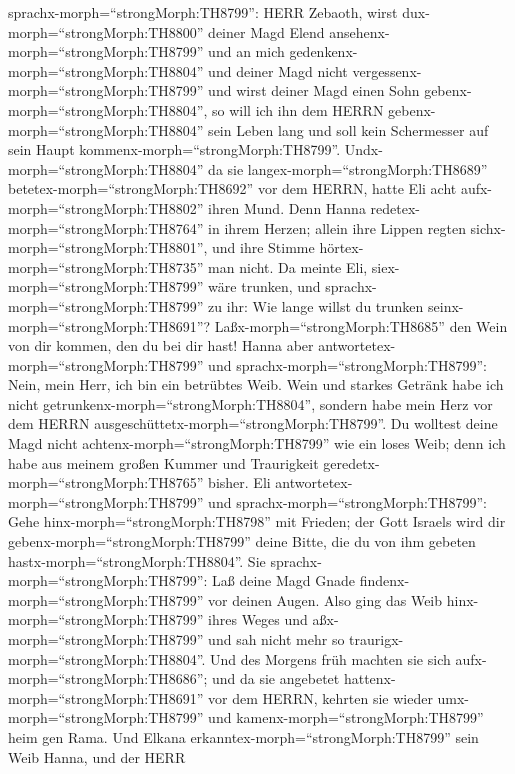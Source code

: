 sprachx-morph=``strongMorph:TH8799'': HERR Zebaoth, wirst
dux-morph=``strongMorph:TH8800'' deiner Magd Elend
ansehenx-morph=``strongMorph:TH8799'' und an mich
gedenkenx-morph=``strongMorph:TH8804'' und deiner Magd nicht
vergessenx-morph=``strongMorph:TH8799'' und wirst deiner Magd einen Sohn
gebenx-morph=``strongMorph:TH8804'', so will ich ihn dem HERRN
gebenx-morph=``strongMorph:TH8804'' sein Leben lang und soll kein
Schermesser auf sein Haupt kommenx-morph=``strongMorph:TH8799''.
 Undx-morph=``strongMorph:TH8804'' da sie
langex-morph=``strongMorph:TH8689'' betetex-morph=``strongMorph:TH8692''
vor dem HERRN, hatte Eli acht aufx-morph=``strongMorph:TH8802'' ihren
Mund.  Denn Hanna redetex-morph=``strongMorph:TH8764'' in
ihrem Herzen; allein ihre Lippen regten
sichx-morph=``strongMorph:TH8801'', und ihre Stimme
hörtex-morph=``strongMorph:TH8735'' man nicht. Da meinte Eli,
siex-morph=``strongMorph:TH8799'' wäre trunken,  und
sprachx-morph=``strongMorph:TH8799'' zu ihr: Wie lange willst du trunken
seinx-morph=``strongMorph:TH8691''? Laßx-morph=``strongMorph:TH8685''
den Wein von dir kommen, den du bei dir hast!  Hanna aber
antwortetex-morph=``strongMorph:TH8799'' und
sprachx-morph=``strongMorph:TH8799'': Nein, mein Herr, ich bin ein
betrübtes Weib. Wein und starkes Getränk habe ich nicht
getrunkenx-morph=``strongMorph:TH8804'', sondern habe mein Herz vor dem
HERRN ausgeschüttetx-morph=``strongMorph:TH8799''.  Du
wolltest deine Magd nicht achtenx-morph=``strongMorph:TH8799'' wie ein
loses Weib; denn ich habe aus meinem großen Kummer und Traurigkeit
geredetx-morph=``strongMorph:TH8765'' bisher.  Eli
antwortetex-morph=``strongMorph:TH8799'' und
sprachx-morph=``strongMorph:TH8799'': Gehe
hinx-morph=``strongMorph:TH8798'' mit Frieden; der Gott Israels wird dir
gebenx-morph=``strongMorph:TH8799'' deine Bitte, die du von ihm gebeten
hastx-morph=``strongMorph:TH8804''.  Sie
sprachx-morph=``strongMorph:TH8799'': Laß deine Magd Gnade
findenx-morph=``strongMorph:TH8799'' vor deinen Augen. Also ging das
Weib hinx-morph=``strongMorph:TH8799'' ihres Weges und
aßx-morph=``strongMorph:TH8799'' und sah nicht mehr so
traurigx-morph=``strongMorph:TH8804''.  Und des Morgens
früh machten sie sich aufx-morph=``strongMorph:TH8686''; und da sie
angebetet hattenx-morph=``strongMorph:TH8691'' vor dem HERRN, kehrten
sie wieder umx-morph=``strongMorph:TH8799'' und
kamenx-morph=``strongMorph:TH8799'' heim gen Rama. Und Elkana
erkanntex-morph=``strongMorph:TH8799'' sein Weib Hanna, und der HERR
